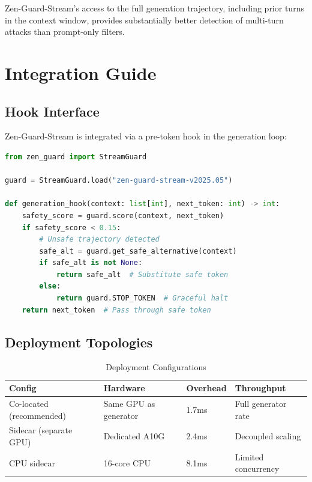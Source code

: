 \documentclass[11pt,a4paper]{article}
\begin{document}
Zen-Guard-Stream's access to the full generation trajectory, including prior turns in the context window, provides substantially better detection of multi-turn attacks than prompt-only filters.

\section{Integration Guide}

\subsection{Hook Interface}

Zen-Guard-Stream is integrated via a pre-token hook in the generation loop:

\begin{lstlisting}[language=Python, caption=Integration Example]
from zen_guard import StreamGuard

guard = StreamGuard.load("zen-guard-stream-v2025.05")

def generation_hook(context: list[int], next_token: int) -> int:
    safety_score = guard.score(context, next_token)
    if safety_score < 0.15:
        # Unsafe trajectory detected
        safe_alt = guard.get_safe_alternative(context)
        if safe_alt is not None:
            return safe_alt  # Substitute safe token
        else:
            return guard.STOP_TOKEN  # Graceful halt
    return next_token  # Pass through safe token
\end{lstlisting}

\subsection{Deployment Topologies}

\begin{table}[H]
\centering
\caption{Deployment Configurations}
\begin{tabular}{llll}
\toprule
\textbf{Config} & \textbf{Hardware} & \textbf{Overhead} & \textbf{Throughput} \\
\midrule
Co-located (recommended) & Same GPU as generator & 1.7ms & Full generator rate \\
Sidecar (separate GPU) & Dedicated A10G & 2.4ms & Decoupled scaling \\
CPU sidecar & 16-core CPU & 8.1ms & Limited concurrency \\
\bottomrule
\end{tabular}
\end{table}
\end{document}
